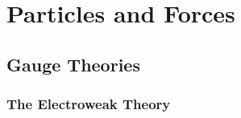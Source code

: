 


\section{Particles and Forces}



\subsection{Gauge Theories}

\subsubsection{The Electroweak Theory}


